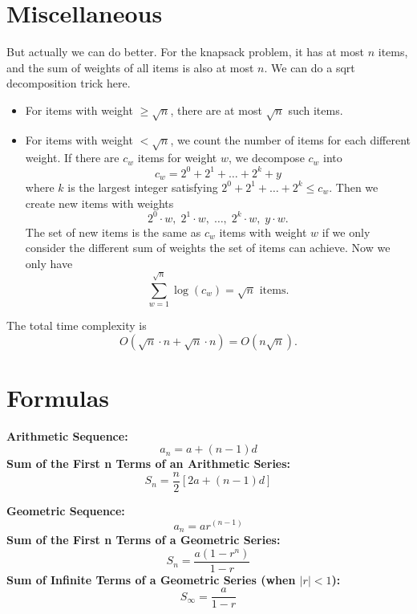 \section{Miscellaneous}
    But actually we can do better. For the knapsack problem, it has at most $n$ items, and the
sum of weights of all items is also at most $n$. We can do a sqrt decomposition trick here.

\begin{itemize}
  \item For items with weight $\geq \sqrt{n}$, there are at most $\sqrt{n}$ such items.
  \item For items with weight $< \sqrt{n}$, we count the number of items for each different weight.
  If there are $c_w$ items for weight $w$, we decompose $c_w$ into
  \[
     c_w = 2^0 + 2^1 + \dots + 2^k + y
  \]
  where $k$ is the largest integer satisfying $2^0 + 2^1 + \dots + 2^k \leq c_w$.
  Then we create new items with weights
  \[
     2^0 \cdot w,\; 2^1 \cdot w,\; \dots,\; 2^k \cdot w,\; y \cdot w.
  \]
  The set of new items is the same as $c_w$ items with weight $w$ if we only consider the
  different sum of weights the set of items can achieve. Now we only have
  \[
     \sum_{w=1}^{\sqrt{n}} \log(c_w) = \sqrt{n} \text{ items.}
  \]
\end{itemize}

The total time complexity is
\[
   O(\sqrt{n} \cdot n + \sqrt{n} \cdot n) = O(n \sqrt{n}).
\]

\section{Formulas}

\textbf{Arithmetic Sequence:}
\[
a_n = a + (n - 1)d
\]
\textbf{Sum of the First n Terms of an Arithmetic Series:}
\[
S_n = \frac{n}{2} \left[ 2a + (n - 1)d \right]
\]

\textbf{Geometric Sequence:}
\[
a_n = ar^{(n-1)}
\]
\textbf{Sum of the First n Terms of a Geometric Series:}
\[
S_n = \frac{a(1 - r^n)}{1 - r}
\]
\textbf{Sum of Infinite Terms of a Geometric Series (when \(|r| < 1\)):}
\[
S_\infty = \frac{a}{1 - r}
\]

